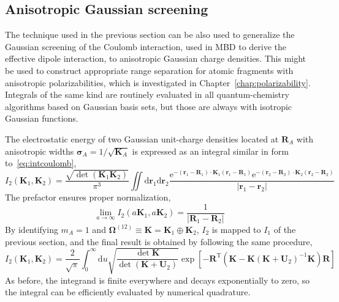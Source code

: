 \subsection{Anisotropic Gaussian screening}

The technique used in the previous section can be also used to generalize the Gaussian screening of the Coulomb interaction, used in MBD to derive the effective dipole interaction, to anisotropic Gaussian charge densities.
This might be used to construct appropriate range separation for atomic fragments with anisotropic polarizabilities, which is investigated in Chapter~\ref{chap:polarizability}.
Integrals of the same kind are routinely evaluated in all quantum-chemistry algorithms based on Gaussian basis sets, but those are always with isotropic Gaussian functions.

The electrostatic energy of two Gaussian unit-charge densities located at $\mathbf R_A$ with anisotropic widths $\boldsymbol\sigma_A=1/\sqrt{\mathbf K_A}$ is expressed as an integral similar in form to~\eqref{eq:intcoulomb},
\begin{equation}
I_2(\mathbf K_1,\mathbf K_2)=\frac{\sqrt{\det(\mathbf K_1\mathbf K_2)}}{\pi^3}\iint\mathrm d\mathbf r_1\mathrm d\mathbf r_2\frac{\mathrm e^{-(\mathbf r_1-\mathbf R_1)\cdot\mathbf K_1(\mathbf r_1-\mathbf R_1)}\mathrm e^{-(\mathbf r_2-\mathbf R_2)\cdot\mathbf K_2(\mathbf r_2-\mathbf R_2)}}{\lvert\mathbf r_1-\mathbf r_2\rvert}
\end{equation}
The prefactor ensures proper normalization,
\begin{equation}
\lim_{a\rightarrow\infty} I_2(a\mathbf K_1,a\mathbf K_2)=\frac1{\lvert\mathbf R_1-\mathbf R_2\rvert}
\end{equation}
By identifying $m_A=1$ and $\boldsymbol\Omega^{(12)}\equiv\mathbf K=\mathbf K_1\oplus\mathbf K_2$, $I_2$ is mapped to $I_1$ of the previous section, and the final result is obtained by following the same procedure,
\begin{equation}
I_2(\mathbf K_1,\mathbf K_2)=\frac{2}{\sqrt\pi}\int_0^\infty\mathrm du\sqrt{\frac{\det\mathbf K}{\det(\mathbf K+\mathbf U_2)}}\exp\left[-\mathbf R^\mathrm T\left(\mathbf K-\mathbf K(\mathbf K+\mathbf U_2)^{-1}\mathbf K\right)\mathbf R\right]
\end{equation}
As before, the integrand is finite everywhere and decays exponentially to zero, so the integral can be efficiently evaluated by numerical quadrature.


